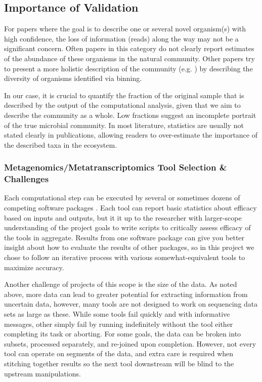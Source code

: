 \subsection{Importance of Validation}
For papers where the goal is to describe one or several novel organism(s) with high confidence, the loss of information (reads) along the way may not be a significant concern.
Often papers in this category do not clearly report estimates of the abundance of these organisms in the natural community.
Other papers try to present a more holistic description of the community (e.g. \cite{kantor2017}) by describing the diversity of organisms identified via binning.

In our case, it is crucial to quantify the fraction of the original sample that is described by the output of the computational analysis, given that we aim to describe the community as a whole.
Low fractions suggest an incomplete portrait of the true microbial community.
In most literature, statistics are usually not stated clearly in publications, allowing readers to over-estimate the importance of the described taxa in the ecosystem.

\subsubsection{Metagenomics/Metatranscriptomics Tool Selection \& Challenges}
Each computational step can be executed by several or sometimes dozens of competing software packages \cite{sangwan2016,thomas2012}.
Each tool can report basic statistics about efficacy based on inputs and outputs, but it it up to the researcher with larger-scope understanding of the project goals to write scripts to critically assess efficacy of the tools in aggregate.
Results from one software package can give you better insight about how to evaluate the results of other packages, so in this project we chose to follow an iterative process with various somewhat-equivalent tools to maximize accuracy.

Another challenge of projects of this scope is the size of the data.
As noted above, more data can lead to greater potential for extracting information from uncertain data, however, many tools are not designed to work on sequencing data sets as large as these.
While some tools fail quickly and with informative messages, other simply fail by running indefinitely without the tool either completing its task or aborting.
For some goals, the data can be broken into subsets, processed separately, and re-joined upon completion.
However, not every tool can operate on segments of the data, and extra care is required when stitching together results so the next tool downstream will be blind to the upstream manipulations.

